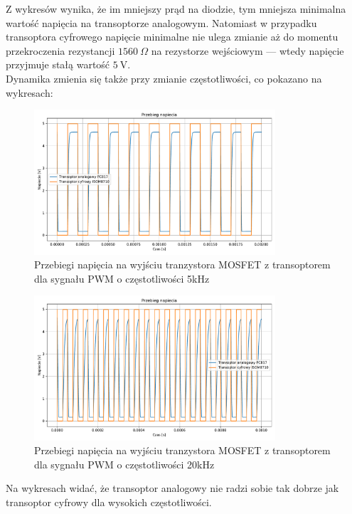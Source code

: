 \documentclass[11pt]{article}
\begin{document}
Z wykresów wynika, że im mniejszy prąd na diodzie, tym mniejsza minimalna wartość napięcia na transoptorze analogowym. Natomiast w przypadku transoptora cyfrowego napięcie minimalne nie ulega zmianie aż do momentu przekroczenia rezystancji $1560\ \Omega$ na rezystorze wejściowym — wtedy napięcie przyjmuje stałą wartość $5\ \mathrm{V}$.\\

Dynamika zmienia się także przy zmianie częstotliwości, co pokazano na wykresach: \\

\begin{figure}[H]
\centering
\includegraphics[width=0.8\textwidth]{aun1_gate_circuit_digital_vs_analog_5khz.pdf}
\caption{Przebiegi napięcia na wyjściu tranzystora MOSFET z transoptorem dla sygnału PWM o częstotliwości 5kHz}
\end{figure}

\begin{figure}[H]
\centering
\includegraphics[width=0.8\textwidth]{aun1_gate_circuit_digital_vs_analog_20khz.pdf}
\caption{Przebiegi napięcia na wyjściu tranzystora MOSFET z transoptorem dla sygnału PWM o częstotliwości 20kHz}
\end{figure}

Na wykresach widać, że transoptor analogowy nie radzi sobie tak dobrze jak transoptor cyfrowy dla wysokich częstotliwości.\\
\end{document}
